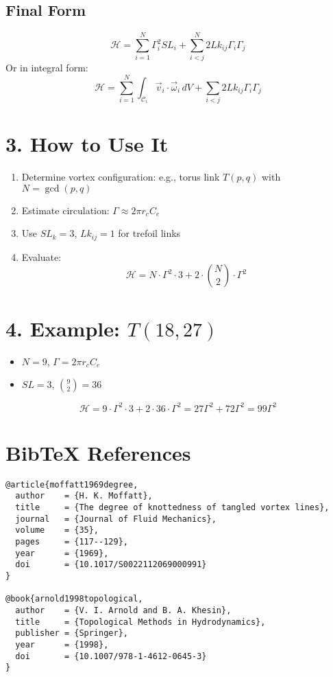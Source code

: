 \subsection*{Final Form}
\begin{equation}
    \boxed{
        \mathcal{H} = \sum_{i=1}^{N} \Gamma_i^2 SL_i + \sum_{i < j}^{N} 2 Lk_{ij} \Gamma_i \Gamma_j
    }
\end{equation}
Or in integral form:
\begin{equation}
    \boxed{
        \mathcal{H} = \sum_{i=1}^{N} \int_{\mathcal{C}_i} \vec{v}_i \cdot \vec{\omega}_i \, dV + \sum_{i < j} 2 Lk_{ij} \Gamma_i \Gamma_j
    }
\end{equation}

\section*{3. How to Use It}
\begin{enumerate}
    \item Determine vortex configuration: e.g., torus link $T(p,q)$ with $N = \gcd(p,q)$
    \item Estimate circulation: $\Gamma \approx 2\pi r_c C_e$
    \item Use $SL_k = 3$, $Lk_{ij} = 1$ for trefoil links
    \item Evaluate:
    \[ \mathcal{H} = N \cdot \Gamma^2 \cdot 3 + 2 \cdot \binom{N}{2} \cdot \Gamma^2 \]
\end{enumerate}

\section*{4. Example: $T(18,27)$}
\begin{itemize}
    \item $N = 9$, $\Gamma = 2\pi r_c C_e$
    \item $SL = 3$, $\binom{9}{2} = 36$
\end{itemize}
\begin{equation}
    \mathcal{H} = 9 \cdot \Gamma^2 \cdot 3 + 2 \cdot 36 \cdot \Gamma^2 = 27\Gamma^2 + 72\Gamma^2 = 99\Gamma^2
\end{equation}

\section*{BibTeX References}
\begin{verbatim}
@article{moffatt1969degree,
  author    = {H. K. Moffatt},
  title     = {The degree of knottedness of tangled vortex lines},
  journal   = {Journal of Fluid Mechanics},
  volume    = {35},
  pages     = {117--129},
  year      = {1969},
  doi       = {10.1017/S0022112069000991}
}

@book{arnold1998topological,
  author    = {V. I. Arnold and B. A. Khesin},
  title     = {Topological Methods in Hydrodynamics},
  publisher = {Springer},
  year      = {1998},
  doi       = {10.1007/978-1-4612-0645-3}
}
\end{verbatim}

